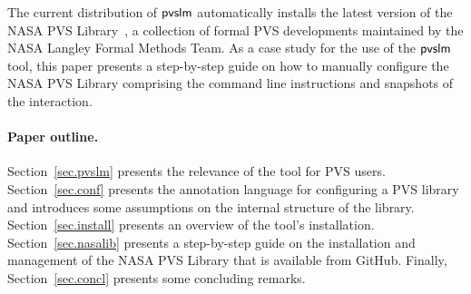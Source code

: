 The current distribution of $\textsf{pvslm}$ automatically installs the latest
version of the NASA PVS Library~\cite{nasalib}, a collection of formal
PVS developments maintained by the NASA Langley Formal Methods
Team. As a case study for the use of the $\textsf{pvslm}$ tool, this paper
presents a step-by-step guide on how to manually configure the NASA
PVS Library comprising the command line instructions and snapshots of
the interaction.

\paragraph{Paper outline.} Section~\ref{sec.pvslm} presents the relevance 
of the tool for PVS users. Section~\ref{sec.conf} presents the
annotation language for configuring a PVS library and introduces some
assumptions on the internal structure of the library. Section~\ref{sec.install} 
presents an overview of the tool's installation. Section~\ref{sec.nasalib} 
presents a step-by-step guide on the installation and management of 
the NASA PVS Library that is available from GitHub. Finally, 
Section~\ref{sec.concl} presents some concluding remarks.
